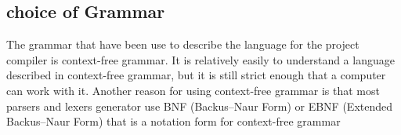\subsection{choice of Grammar}
The grammar that have been use to describe the language for the  project compiler is context-free grammar. It is relatively easily to understand a language described in context-free grammar, but it is still strict enough that a computer can work with it. Another reason for using context-free grammar is that most parsers and lexers generator use BNF (Backus–Naur Form) or EBNF (Extended Backus–Naur Form) that is a notation form for context-free grammar